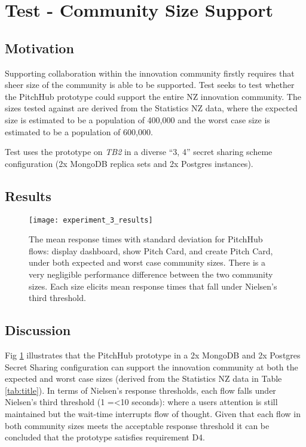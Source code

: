 \section{Test  - Community Size Support}

\subsection{Motivation}
Supporting collaboration within the innovation community firstly requires that sheer size of the community is able to be supported. Test  seeks to test whether the PitchHub prototype could support the entire NZ innovation community. The sizes tested against are derived from the Statistics NZ data, where the expected size is estimated to be a population of 400,000 and the worst case size is estimated to be a population of 600,000.

Test  uses the prototype on \textit{TB2} in a diverse ``3, 4'' secret sharing scheme configuration (2x MongoDB replica sets and 2x Postgres instances).

\subsection{Results}

\begin{figure}[ht]
    \centering
    \texttt{[image: experiment\_3\_results]}
    \caption{The mean response times with standard deviation for PitchHub flows: display dashboard, show Pitch Card, and create Pitch Card, under both expected and worst case community sizes. There is a very negligible performance difference between the two community sizes. Each size elicits mean response times that fall under Nielsen's third threshold. }
    \label{fig:test_3_results}
\end{figure}

\subsection{Discussion}

Fig \ref{fig:test_3_results} illustrates that the PitchHub prototype in a 2x MongoDB and 2x Postgres Secret Sharing configuration can support the innovation community at both the expected and worst case sizes (derived from the Statistics NZ data in Table \ref{tab:title}). In terms of Nielsen's response thresholds, each flow falls under Nielsen's third threshold (1 =\textless 10 seconds): where a users attention is still maintained but the wait-time interrupts flow of thought. Given that each flow in both community sizes meets the acceptable response threshold it can be concluded that the prototype satisfies requirement D4.

